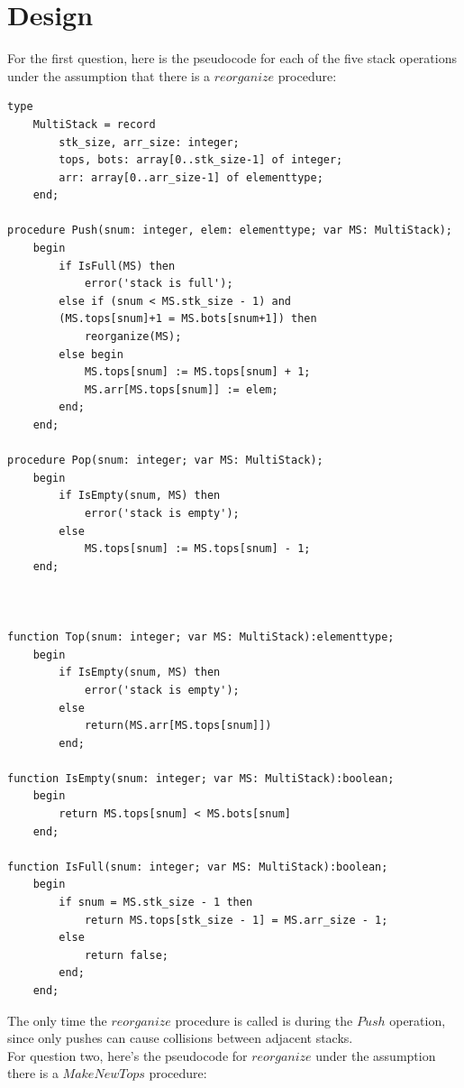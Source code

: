 \documentclass[12pt]{report}
\begin{document}
\chapter{Design}
\label{chapter:design}
For the first question, here is the pseudocode for each of the five stack operations
under the assumption that there is a $reorganize$ procedure:
\begin{verbatim}
type
    MultiStack = record
        stk_size, arr_size: integer;
        tops, bots: array[0..stk_size-1] of integer;
        arr: array[0..arr_size-1] of elementtype;
    end;

procedure Push(snum: integer, elem: elementtype; var MS: MultiStack);
    begin
        if IsFull(MS) then
            error('stack is full');
        else if (snum < MS.stk_size - 1) and 
        (MS.tops[snum]+1 = MS.bots[snum+1]) then
            reorganize(MS);
        else begin
            MS.tops[snum] := MS.tops[snum] + 1;
            MS.arr[MS.tops[snum]] := elem;
        end;
    end;

procedure Pop(snum: integer; var MS: MultiStack);
    begin
        if IsEmpty(snum, MS) then
            error('stack is empty');
        else
            MS.tops[snum] := MS.tops[snum] - 1;
    end;



function Top(snum: integer; var MS: MultiStack):elementtype;
    begin
        if IsEmpty(snum, MS) then
            error('stack is empty');
        else
            return(MS.arr[MS.tops[snum]])
        end;

function IsEmpty(snum: integer; var MS: MultiStack):boolean;
    begin
        return MS.tops[snum] < MS.bots[snum]
    end;

function IsFull(snum: integer; var MS: MultiStack):boolean;
    begin
        if snum = MS.stk_size - 1 then
            return MS.tops[stk_size - 1] = MS.arr_size - 1;
        else
            return false;
        end;
    end;
\end{verbatim}
The only time the $reorganize$ procedure is called is during the $Push$ operation,
since only pushes can cause collisions between adjacent stacks.
\pagebreak
\\For question two, here's the pseudocode for $reorganize$
under the assumption there is a $MakeNewTops$ procedure:
\end{document}
